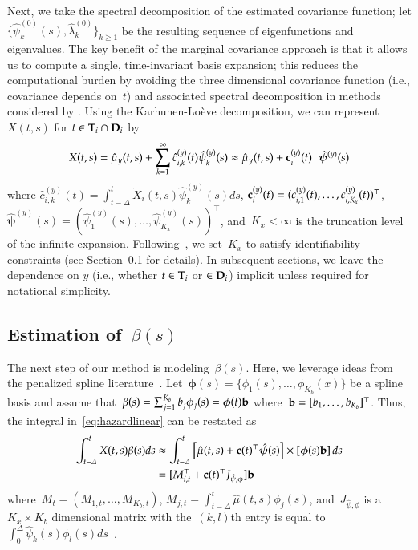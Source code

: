 \documentclass[12pt]{amsart}
\def\bfT{{\bf T}}
\def\bfD{{\bf D}}
\begin{document}
Next, we take the spectral decomposition of the estimated covariance function; let $\{ \hat \psi^{(0)}_k (s),\hat \lambda^{(0)}_k \}_{k \geq 1}$ be the resulting sequence of eigenfunctions and eigenvalues. The key benefit of the marginal covariance approach is that it allows us to compute a single, time-invariant basis expansion; this reduces the computational burden by avoiding the three dimensional covariance function (i.e., covariance depends on~$t$) and associated spectral decomposition in methods considered by \cite{ChenMuller2012}. Using the Karhunen-Lo{\`e}ve decomposition, we can represent~$X(t,s)$ for $t \in \bfT_i \cap \bfD_i$ by
\[
X(t,s) = \hat \mu_y (t,s) + \sum_{k=1}^{\infty} \hat c^{(y)}_{i,k} (t) \hat
\psi^{(y)}_k (s) \approx \hat \mu_y (t,s) + {\bf c}^{(y)}_{i} (t)^\top \mathbold{\hat
  \psi}^{(y)} (s)
\]
where $\hat c^{(y)}_{i,k} (t) = \int_{t-\Delta}^t \tilde X_i (t,s) \hat \psi^{(y)}_k (s) ds$, ${\bf c}^{(y)}_i (t) = (c^{(y)}_{i,1} (t), \ldots, c^{(y)}_{i,K_x} (t))^\top$, $\mathbold{\hat \psi}^{(y)} (s) = (\hat \psi^{(y)}_1 (s), \ldots, \hat \psi^{(y)}_{K_x} (s))^\top$, and~$K_x < \infty$ is the truncation level of the infinite expansion. Following~\cite{Goldsmith2011}, we set~$K_x$ to satisfy identifiability constraints (see Section~\ref{section:beta} for details). In subsequent sections, we leave the dependence on $y$ (i.e., whether $t \in \bfT_i$ or $\in \bfD_i$) implicit unless required for notational simplicity.


\subsection{Estimation of~$\beta(s)$}
\label{section:beta}

The next step of our method is modeling~$\beta(s)$. Here, we leverage ideas from the penalized spline literature~\citep{Ruppert2003, Wood2006book}. Let~$\mathbold{\phi} (s) = \{ \phi_1 (s), \ldots, \phi_{K_b} (x) \}$ be a spline basis and assume that~$\beta(s) = \sum_{j=1}^{K_b} b_j \phi_{j} (s) = \mathbold{\phi} (t) {\bf b}$ where~${\bf b} = [b_1, \ldots, b_{K_b}]^{\top}$. Thus, the integral in~\eqref{eq:hazardlinear} can be restated as
\begin{align*}
\int_{t-\Delta}^t X(t,s) \beta(s) ds
  &\approx \int_{t-\Delta}^t \left[ \hat \mu(t,s) + {\bf c} (t)^\top
    \mathbold{\hat \psi} (s) \right] \times \left[
    \mathbold{\phi} (s) {\bf b} \right] ds \\
  &= [ M_{i,t}^\top + {\bf c} (t)^\top J_{\hat \psi, \phi} ] {\bf b}
\end{align*}
where~$M_{t} = (M_{1,t}, \ldots, M_{K_b,t})$, $M_{j,t} = \int_{t-\Delta}^t \hat \mu (t,s) \phi_j (s)$, and~$J_{\hat \psi, \phi}$ is a $K_x \times K_b$ dimensional matrix with the~$(k,l)$th entry is equal to~$\int_{0}^\Delta \hat \psi_k (s) \phi_l (s) ds$~\citep{RamsaySilverman2005}.
\end{document}
